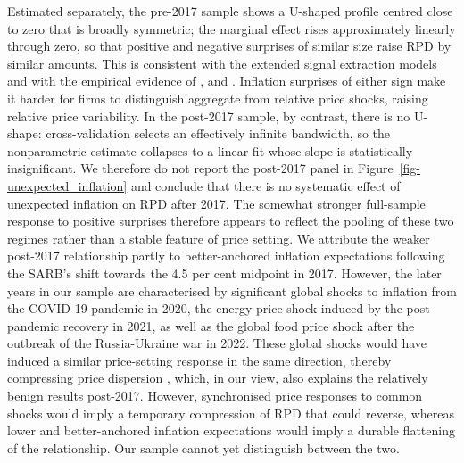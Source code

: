 \documentclass[
  letterpaper,
  DIV=11,
  numbers=noendperiod]{scrartcl}
\begin{document}
Estimated separately, the pre-2017 sample shows a U-shaped profile
centred close to zero that is broadly symmetric; the marginal effect
rises approximately linearly through zero, so that positive and negative
surprises of similar size raise RPD by similar amounts. This is
consistent with the extended signal extraction models
\citep{hercowitz1981, cukierman1983} and with the empirical evidence of
\citet{caraballo2013}, \citet{becker2012} and \citet{sara-zaror2024}.
Inflation surprises of either sign make it harder for firms to
distinguish aggregate from relative price shocks, raising relative price
variability. In the post-2017 sample, by contrast, there is no U-shape:
cross-validation selects an effectively infinite bandwidth, so the
nonparametric estimate collapses to a linear fit whose slope is
statistically insignificant. We therefore do not report the post-2017
panel in Figure~\ref{fig-unexpected_inflation} and conclude that there
is no systematic effect of unexpected inflation on RPD after 2017. The
somewhat stronger full-sample response to positive surprises therefore
appears to reflect the pooling of these two regimes rather than a stable
feature of price setting. We attribute the weaker post-2017 relationship
partly to better-anchored inflation expectations \citep{durand2023}
following the SARB's shift towards the 4.5 per cent midpoint in 2017.
However, the later years in our sample are characterised by significant
global shocks to inflation from the COVID-19 pandemic in 2020, the
energy price shock induced by the post-pandemic recovery in 2021, as
well as the global food price shock after the outbreak of the
Russia-Ukraine war in 2022. These global shocks would have induced a
similar price-setting response in the same direction, thereby
compressing price dispersion \citep{nakamura2018}, which, in our view,
also explains the relatively benign results post-2017. However,
synchronised price responses to common shocks would imply a temporary
compression of RPD that could reverse, whereas lower and better-anchored
inflation expectations would imply a durable flattening of the
relationship. Our sample cannot yet distinguish between the two.
\end{document}

